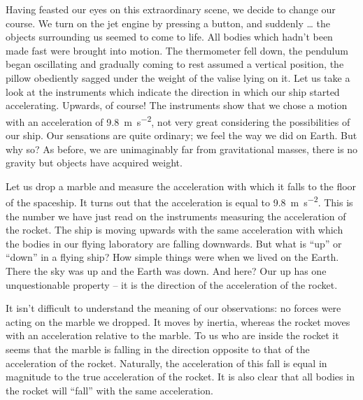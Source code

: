 Having feasted our eyes on this extraordinary scene,
we decide to change our course. We turn on the jet engine
by pressing a button, and suddenly \ldots{} the objects surrounding us seemed to come to life. All bodies which
hadn't been made fast were brought into motion. The
thermometer fell down, the pendulum began oscillating
and gradually coming to rest assumed a vertical position,
the pillow obediently sagged under the weight of the
valise lying on it. Let us take a look at the instruments
which indicate the direction in which our ship started
accelerating. Upwards, of course! The instruments show
that we chose a motion with an acceleration of \SI{9.8}{\meter\per\second\squared}, not very great considering the possibilities of our ship. Our sensations are quite ordinary; we feel the way we did on Earth. But why so? As before, we are unimaginably
far from gravitational masses, there is no gravity but
objects have acquired weight.

Let us drop a marble and measure the acceleration with which it falls to the floor of the spaceship. It turns out that the acceleration is equal to \SI{9.8}{\meter\per\second\squared}. This is the number we have just read on the instruments measuring the acceleration of the rocket. The ship is moving upwards with the same acceleration with which the bodies in our flying laboratory are falling downwards.
But what is ``up'' or ``down'' in a flying ship? How simple
things were when we lived on the Earth. There the sky
was up and the Earth was down. And here? Our up has
one unquestionable property -- it is the direction of the
acceleration of the rocket.

It isn't difficult to understand the meaning of our
observations: no forces were acting on the marble we
dropped. It moves by inertia, whereas the rocket moves
with an acceleration relative to the marble. To us who
are inside the rocket it seems that the marble is falling
in the direction opposite to that of the acceleration of the
rocket. Naturally, the acceleration of this fall is equal
in magnitude to the true acceleration of the rocket. It
is also clear that all bodies in the rocket will ``fall'' with
the same acceleration.

